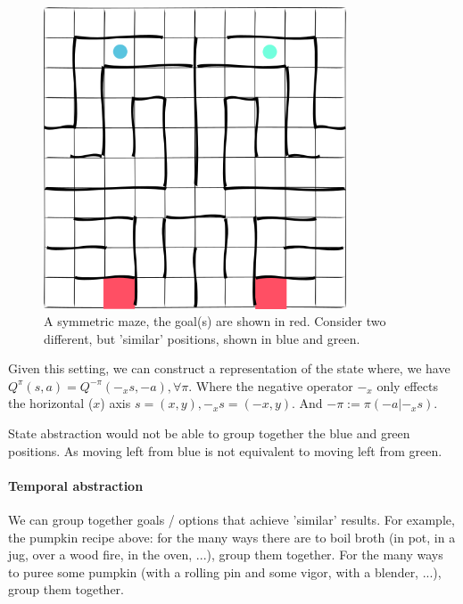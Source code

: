 \begin{figure}[h!]
\centering
\includegraphics[width=0.8\textwidth,height=0.4\textheight]{../../pictures/drawings/maze.png}
\caption{A symmetric maze, the goal(s) are shown in red.
Consider two different, but 'similar' positions, shown in blue and green.}
\end{figure}

Given this setting, we can construct a representation of the state \footnotemark[11] where,
we have $Q^{\pi}(s, a) = Q^{-\pi}(-_xs, -a), \forall \pi$.
Where the negative operator $-_x$ only effects the horizontal ($x$) axis $s = (x, y), -_xs = (-x, y)$.
And $-\pi := \pi(-a|-_xs)$.


State abstraction would not be able to group together the blue and green positions.
As moving left from blue is not equivalent to moving left from green.

\paragraph{Temporal abstraction}

We can group together goals / options that achieve 'similar' results.
For example, the pumpkin recipe above: for the many ways there are to boil broth
(in pot, in a jug, over a wood fire, in the oven, ...), group them together.
For the many ways to puree some pumpkin (with a rolling pin and some vigor, with a blender, ...), group them together.

